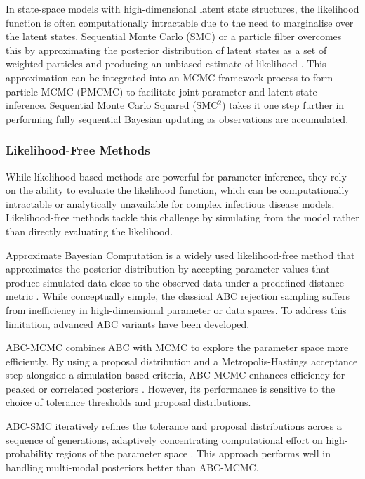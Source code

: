 \documentclass{article}
\begin{document}
In state-space models with high-dimensional latent state structures, the likelihood function is often computationally intractable due to the need to marginalise over the latent states. Sequential Monte Carlo (SMC) or a particle filter overcomes this by approximating the posterior distribution of latent states as a set of weighted particles and producing an unbiased estimate of likelihood \citep{doucet2001introduction, arulampalam2002tutorial}. This approximation can be integrated into an MCMC framework process to form particle MCMC (PMCMC) \citep{andrieu2010particle, endo2019introduction} to facilitate joint parameter and latent state inference. Sequential Monte Carlo Squared (SMC$^2$) \citep{chopin2013smc2} takes it one step further in performing fully sequential Bayesian updating as observations are accumulated.

\subsubsection{Likelihood-Free Methods}

While likelihood-based methods are powerful for parameter inference, they rely on the ability to evaluate the likelihood function, which can be computationally intractable or analytically unavailable for complex infectious disease models. Likelihood-free methods tackle this challenge by simulating from the model rather than directly evaluating the likelihood.

Approximate Bayesian Computation is a widely used likelihood-free method that approximates the posterior distribution by accepting parameter values that produce simulated data close to the observed data under a predefined distance metric \citep{rubin1984bayesianly, tavare1997inferring, beaumont2002approximate}. While conceptually simple, the classical ABC rejection sampling suffers from inefficiency in high-dimensional parameter or data spaces. To address this limitation, advanced ABC variants have been developed. 

ABC-MCMC combines ABC with MCMC to explore the parameter space more efficiently. By using a proposal distribution and a Metropolis-Hastings acceptance step alongside a simulation-based criteria, ABC-MCMC enhances efficiency for peaked or correlated posteriors \citep{marjoram2003markov, wegmann2009efficient, kypraios2017tutorial}. However, its performance is sensitive to the choice of tolerance thresholds and proposal distributions.

ABC-SMC iteratively refines the tolerance and proposal distributions across a sequence of generations, adaptively concentrating computational effort on high-probability regions of the parameter space \citep{sisson2007sequential, toni2009approximate, beaumont2009adaptive, drovandi2011likelihood}. This approach performs well in handling multi-modal posteriors better than ABC-MCMC.
\end{document}
